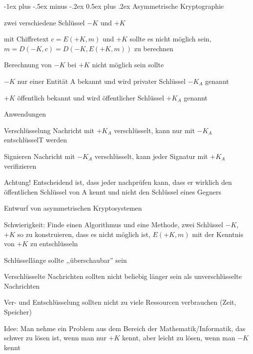 \documentclass[a4paper]{article}
\makeatletter
\renewcommand{\section}{\@startsection{section}{1}{0mm}%
 {-1ex plus -.5ex minus -.2ex}%
 {0.5ex plus .2ex}%
 {\normalfont\large\bfseries}}
\makeatother
\begin{document}
\begin{multicols}{3}
      \section{Asymmetrische Kryptographie}
      \begin{itemize*}
            \item zwei verschiedene Schlüssel $-K$ und $+K$
            \item mit Chiffretext $c=E(+K, m)$ und $+K$ sollte es nicht möglich sein, $m=D(-K,c) =D(-K,E(+K,m))$ zu berechnen
            \item Berechnung von $-K$ bei $+K$ nicht möglich sein sollte
            \item $-K$ nur einer Entität A bekannt und wird privater Schlüssel $-K_A$ genannt
            \item $+K$ öffentlich bekannt und wird öffentlicher Schlüssel $+K_A$ genannt
            \item Anwendungen
            \begin{description*}
                  \item[Verschlüsselung] Nachricht mit $+K_A$ verschlüsselt, kann nur mit $-K_A$ entschlüsselT werden
                  \item[Signieren] Nachricht mit $-K_A$ verschlüsselt, kann jeder Signatur mit $+K_A$ verifizieren
                  \item[Achtung!] Entscheidend ist, dass jeder nachprüfen kann, dass er wirklich den öffentlichen Schlüssel von A kennt und nicht den Schlüssel eines Gegners
            \end{description*}
            \item Entwurf von asymmetrischen Kryptosystemen
            \begin{itemize*}
                  \item Schwierigkeit: Finde einen Algorithmus und eine Methode, zwei Schlüssel $-K$, $+K$ so zu konstruieren, dass es nicht möglich ist, $E(+K, m)$ mit der Kenntnis von $+K$ zu entschlüsseln
                  \item Schlüssellänge sollte ,,überschaubar'' sein
                  \item Verschlüsselte Nachrichten sollten nicht beliebig länger sein als unverschlüsselte Nachrichten
                  \item Ver- und Entschlüsselung sollten nicht zu viele Ressourcen verbrauchen (Zeit, Speicher)
                  \item Idee: Man nehme ein Problem aus dem Bereich der Mathematik/Informatik, das schwer zu lösen ist, wenn man nur $+K$ kennt, aber leicht zu lösen, wenn man $-K$ kennt

\end{itemize*}
\end{itemize*}
\end{multicols}
\end{document}
